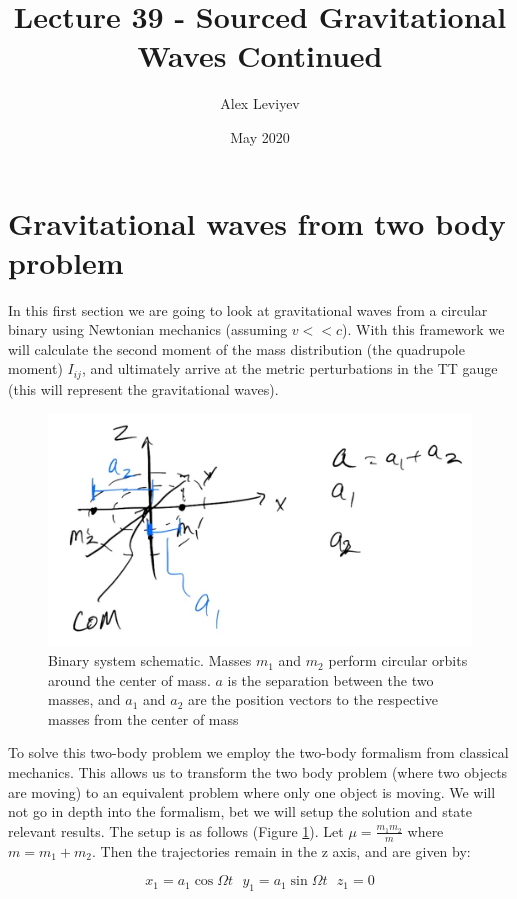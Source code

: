 \documentclass{article}
\title{Lecture 39 - Sourced Gravitational Waves Continued}
\author{Alex Leviyev}
\date{May 2020}
\theoremstyle{definition}
\theoremstyle{remark}
\begin{document}
\maketitle

\section{Gravitational waves from two body problem}
In this first section we are going to look at gravitational waves from a circular binary using Newtonian mechanics (assuming $v << c$). With this framework we will calculate the second moment of the mass distribution (the quadrupole moment) $I_{ij}$, and ultimately arrive at the metric perturbations in the TT gauge (this will represent the gravitational waves).

\begin{figure}
    \centering
    \includegraphics{figures/binary diagram.jpg}
    \caption{Binary system schematic. Masses $m_1$ and $m_2$ perform circular orbits around the center of mass. $a$ is the separation between the two masses, and $a_1$ and $a_2$ are the position vectors to the respective masses from the center of mass}
    \label{fig:binary}
\end{figure}

To solve this two-body problem we employ the two-body formalism from classical mechanics. This allows us to transform the two body problem (where two objects are moving) to an equivalent problem where only one object is moving. We will not go in depth into the formalism, bet we will setup the solution and state relevant results. The setup is as follows (Figure \ref{fig:binary}). Let $\mu = \frac{m_1 m_2}{m}$ where $m = m_1 + m_2$. Then the trajectories remain in the z axis, and are given by:


$$
x_1 = a_1 \cos \Omega t \: \: \: y_1 = a_1 \sin \Omega t \: \: \: z_1 = 0
$$
\end{document}
